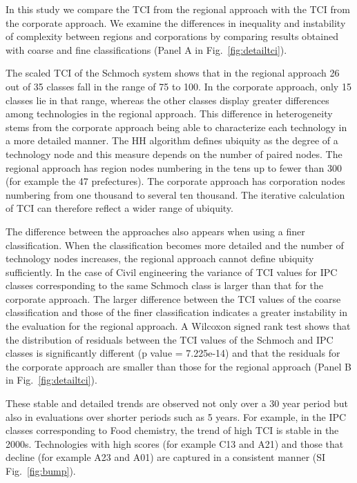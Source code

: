 \documentclass[fleqn,10pt]{wlscirep}
\begin{document}
In this study we compare the TCI from the regional approach with the TCI from the corporate approach. We examine the differences in inequality and instability of complexity between regions and corporations by comparing results obtained with coarse and fine classifications (Panel A in Fig.~\ref{fig:detailtci}).

The scaled TCI of the Schmoch system shows that in the regional approach 26 out of 35 classes fall in the range of 75 to 100. 
In the corporate approach, only 15 classes lie in that range, whereas the other classes display greater differences among technologies in the regional approach. 
This difference in heterogeneity stems from the corporate approach being able to characterize each technology in a more detailed manner. The HH algorithm defines ubiquity as the degree of a technology node and this measure depends on the number of paired nodes. The regional approach has region nodes numbering in the tens up to fewer than 300 (for example the 47 prefectures). The corporate approach has corporation nodes numbering from one thousand to several ten thousand. The iterative calculation of TCI can therefore reflect a wider range of ubiquity.

The difference between the approaches also appears when using a finer classification. When the classification becomes more detailed and the number of technology nodes increases, the regional approach cannot define ubiquity sufficiently. In the case of Civil engineering the variance of TCI values for IPC classes corresponding to the same Schmoch class is larger than that for the corporate approach. The larger difference between the TCI values of the coarse classification and those of the finer classification indicates a greater instability in the evaluation for the regional approach. A Wilcoxon signed rank test shows that the distribution of residuals between the TCI values of the Schmoch and IPC classes is significantly different (p value = 7.225e-14) and that the residuals for the corporate approach are smaller than those for the regional approach (Panel B in Fig.~\ref{fig:detailtci}).

These stable and detailed trends are observed not only over a 30 year period but also in evaluations over shorter periods such as 5 years. For example, in the IPC classes corresponding to Food chemistry, the trend of high TCI is stable in the 2000s. Technologies with high scores (for example C13 and A21) and those that decline (for example A23 and A01) are captured in a consistent manner (SI Fig.~\ref{fig:bump}).
\end{document}

